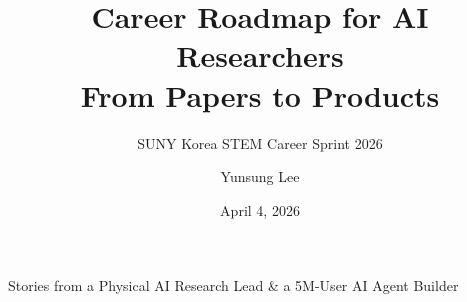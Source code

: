 

\usepackage{pgfplots}
\pgfplotsset{compat=1.18}
\usetikzlibrary{positioning}
\usepackage[normalem]{ulem}
\usepackage{qrcode}


\title{Career Roadmap for AI Researchers\\From Papers to Products}
\subtitle{SUNY Korea STEM Career Sprint 2026}
\author{Yunsung Lee}
\date{April 4, 2026}




\begin{frame}[plain]
\maketitle
\vspace{1.2em}
\begin{center}
  {\small\color{primarygold}
    Stories from a Physical AI Research Lead \& a 5M-User AI Agent Builder}
\end{center}
\end{frame}

